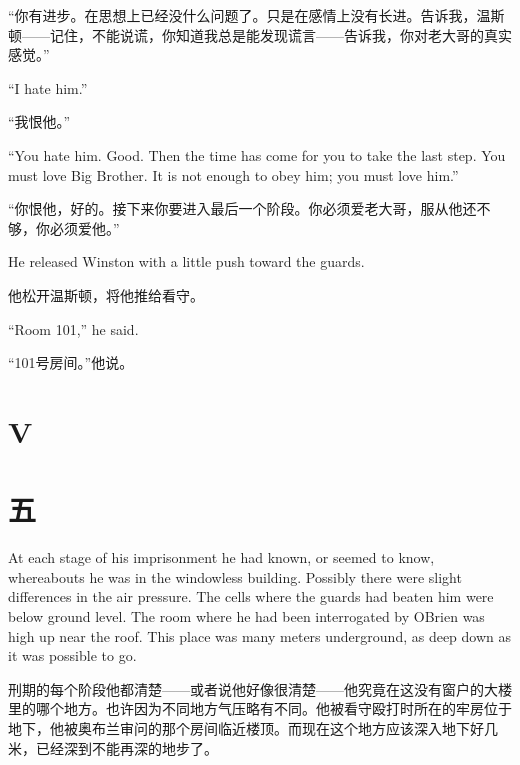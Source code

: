 \begin{paracol}{2}
\switchcolumn

``你有进步。在思想上已经没什么问题了。只是在感情上没有长进。告诉我，温斯顿——记住，不能说谎，你知道我总是能发现谎言——告诉我，你对老大哥的真实感觉。''

\switchcolumn*

``I hate him.''

\switchcolumn

``我恨他。''

\switchcolumn*

``You hate him. Good. Then the time has come for you to take the last
step. You must love Big Brother. It is not enough to obey him; you must
love him.''

\switchcolumn

``你恨他，好的。接下来你要进入最后一个阶段。你必须爱老大哥，服从他还不够，你必须爱他。''

\switchcolumn*

He released Winston with a little push toward the guards.

\switchcolumn

他松开温斯顿，将他推给看守。

\switchcolumn*

``Room 101,'' he said.

\switchcolumn

``101号房间。''他说。

\switchcolumn*


\section{V}\label{v-2}

\switchcolumn

\section*{五}\label{ux4e8cux5341ux4e09}

\switchcolumn*

At each stage of his imprisonment he had known, or seemed to know,
whereabouts he was in the windowless building. Possibly there were
slight differences in the air pressure. The cells where the guards had
beaten him were below ground level. The room where he had been
interrogated by O\textquotesingle Brien was high up near the roof. This
place was many meters underground, as deep down as it was possible to
go.

\switchcolumn

刑期的每个阶段他都清楚——或者说他好像很清楚——他究竟在这没有窗户的大楼里的哪个地方。也许因为不同地方气压略有不同。他被看守殴打时所在的牢房位于地下，他被奥布兰审问的那个房间临近楼顶。而现在这个地方应该深入地下好几米，已经深到不能再深的地步了。


\end{paracol}

